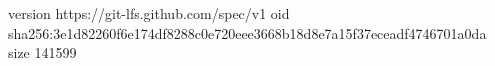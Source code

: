 version https://git-lfs.github.com/spec/v1
oid sha256:3e1d82260f6e174df8288c0e720eee3668b18d8e7a15f37eceadf4746701a0da
size 141599
